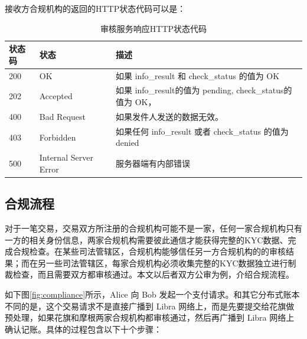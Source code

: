 接收方合规机构的返回的HTTP状态代码可以是：
\begin{table}[h]
    \caption{审核服务响应HTTP状态代码} 
    \label{tab:auth_http_status}
    \small %
    \centering %
    \begin{tabular}{lll} %
        \toprule[\heavyrulewidth]\toprule[\heavyrulewidth]
        \textbf{状态码} & \textbf{状态} & \textbf{描述} \\ 
        \midrule
        200 & OK & 如果 info\_result 和 check\_status 的值为 OK \\
        202 & Accepted &  如果 info\_result的值为 pending, check\_status的值为 OK，\\
        400 & Bad Request &  如果发件人发送的数据无效。\\
        403 & Forbidden &  如果任何 info\_result 或者 check\_status 的值为 denied\\
        500 & Internal Server Error &  服务器端有内部错误 \\
        \bottomrule[\heavyrulewidth] 
    \end{tabular}
\end{table}

\subsection{合规流程}

对于一笔交易，交易双方所注册的合规机构可能不是一家，任何一家合规机构只有一方的相关身份信息，两家合规机构需要彼此通信才能获得完整的KYC数据、完成合规检查。在某些司法管辖区，合规机构能够信任另一方合规机构的的审核结果；而在另一些司法管辖区，每家合规机构必须收集完整的KYC数据独立进行制裁检查，而且需要双方都审核通过。本文以后者双方公审为例，介绍合规流程。

如下图\ref{fig:compliance}所示，Alice 向 Bob 发起一个支付请求。和其它分布式账本不同的是，这个交易请求不是直接广播到 Libra 网络上，而是先要提交给花旗做预处理，如果花旗和摩根两家合规机构都审核通过，然后再广播到 Libra 网络上确认记账。具体的过程包含以下十个步骤：

